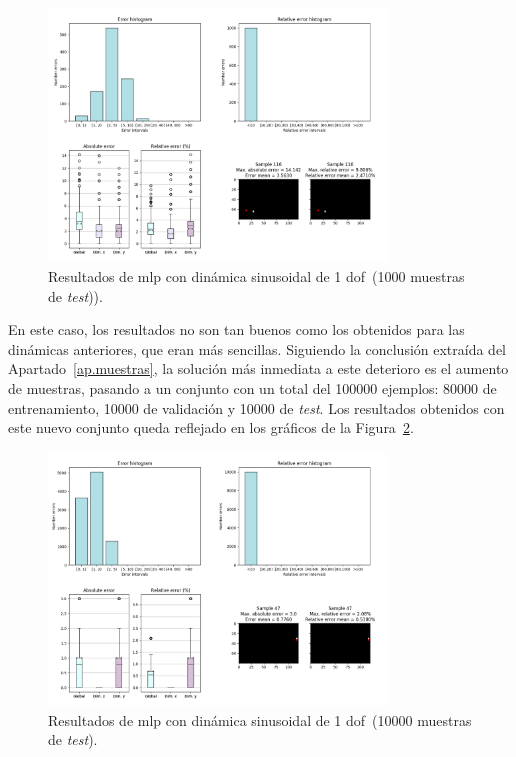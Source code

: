 \begin{figure}[H]
		\begin{center}
			\includegraphics[width=0.8\textwidth]{ figures/test_mod/NOREC/sin_fix_10000.png}
			\caption{Resultados de \acrshort{mlp} con dinámica sinusoidal de 1 \acrshort{dof}~(1000 muestras de \textit{test})).} 
			\label{fig.norec_sin_fix_10000}
		\end{center}
\end{figure}
\vspace{-10pt}

En este caso, los resultados no son tan buenos como los obtenidos para las dinámicas anteriores, que eran más sencillas. Siguiendo la conclusión extraída del Apartado~\ref{ap.muestras}, la solución más inmediata a este deterioro es el aumento de muestras, pasando a un conjunto con un total del 100000 ejemplos: 80000 de entrenamiento, 10000 de validación y 10000 de \textit{test}. Los resultados obtenidos con este nuevo conjunto queda reflejado en los gráficos de la Figura~\ref{fig.norec_sin_fix_100000}.

\begin{figure}[H]
		\begin{center}
			\includegraphics[width=0.8\textwidth]{ figures/test_mod/NOREC/sin_fix_100000.png}
			\caption{Resultados de \acrshort{mlp} con dinámica sinusoidal de 1 \acrshort{dof}~(10000 muestras de \textit{test}).}
			\label{fig.norec_sin_fix_100000}
		\end{center}
\end{figure}
\vspace{-10pt}

